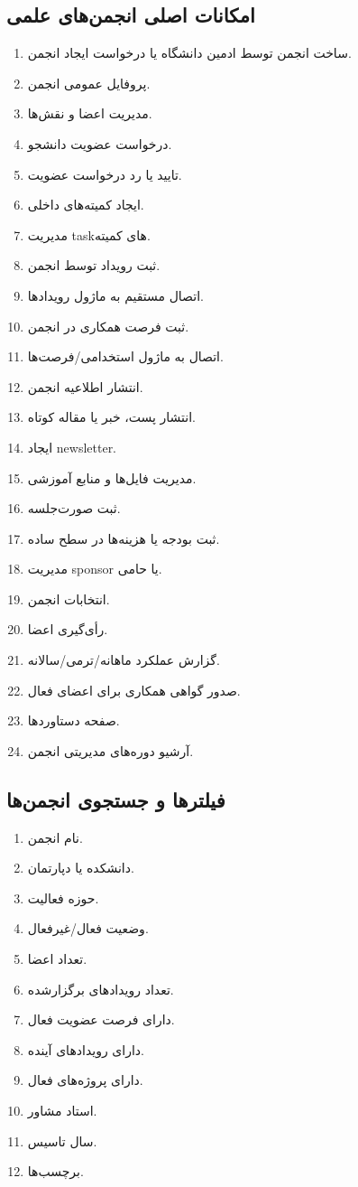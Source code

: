 \documentclass[12pt,a4paper]{article}
\begin{document}
\subsection{امکانات اصلی انجمن‌های علمی}
\begin{enumerate}
\item ساخت انجمن توسط ادمین دانشگاه یا درخواست ایجاد انجمن.
\item پروفایل عمومی انجمن.
\item مدیریت اعضا و نقش‌ها.
\item درخواست عضویت دانشجو.
\item تایید یا رد درخواست عضویت.
\item ایجاد کمیته‌های داخلی.
\item مدیریت taskهای کمیته.
\item ثبت رویداد توسط انجمن.
\item اتصال مستقیم به ماژول رویدادها.
\item ثبت فرصت همکاری در انجمن.
\item اتصال به ماژول استخدامی/فرصت‌ها.
\item انتشار اطلاعیه انجمن.
\item انتشار پست، خبر یا مقاله کوتاه.
\item ایجاد newsletter.
\item مدیریت فایل‌ها و منابع آموزشی.
\item ثبت صورت‌جلسه.
\item ثبت بودجه یا هزینه‌ها در سطح ساده.
\item مدیریت sponsor یا حامی.
\item انتخابات انجمن.
\item رأی‌گیری اعضا.
\item گزارش عملکرد ماهانه/ترمی/سالانه.
\item صدور گواهی همکاری برای اعضای فعال.
\item صفحه دستاوردها.
\item آرشیو دوره‌های مدیریتی انجمن.
\end{enumerate}

\subsection{فیلترها و جستجوی انجمن‌ها}
\begin{enumerate}
\item نام انجمن.
\item دانشکده یا دپارتمان.
\item حوزه فعالیت.
\item وضعیت فعال/غیرفعال.
\item تعداد اعضا.
\item تعداد رویدادهای برگزارشده.
\item دارای فرصت عضویت فعال.
\item دارای رویدادهای آینده.
\item دارای پروژه‌های فعال.
\item استاد مشاور.
\item سال تاسیس.
\item برچسب‌ها.
\end{enumerate}
\end{document}
